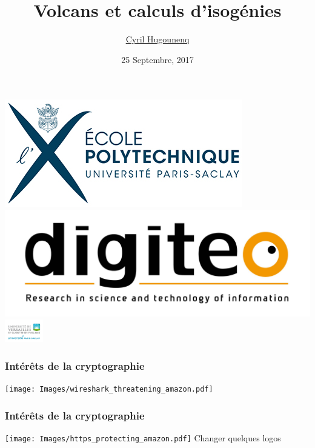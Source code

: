 \documentclass[10pt,a4paper]{beamer}
\theoremstyle{plain}
\theoremstyle{definition}
\theoremstyle{definition}
\theoremstyle{definition}
\theoremstyle{definition}
\theoremstyle{remark}
\theoremstyle{remark}
\theoremstyle{definition}
\begin{document}
\author{
\href{http://www.prism.uvsq.fr/~huc/}{Cyril Hugounenq}
}
\title[Volcans et calculs d'isogénies]{
Volcans et calculs d'isogénies}
\date{25 Septembre, 2017}


\begin{frame}
\titlepage

\hfill
\includegraphics[scale=0.6]{Images/Logo_Ecole_polytechnique_horizontal_300dpi.jpg} \hfill
\includegraphics[scale=0.1]{Images/digiteo.jpg}\hfill
\includegraphics[height=10mm]{Images/uvsq-logo-cmjn.jpg}
\end{frame}

\begin{frame}
\frametitle{Intérêts de la cryptographie}
\texttt{[image: Images/wireshark\_threatening\_amazon.pdf]} 
\end{frame}

\begin{frame}
\frametitle{Intérêts de la cryptographie}
\texttt{[image: Images/https\_protecting\_amazon.pdf]} 
Changer quelques logos
\end{frame}
\end{document}
